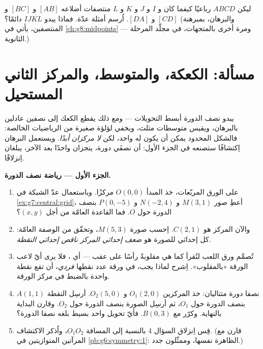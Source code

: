 \begin{exercise}[$\star\star\star$]\label{exo:g7:central:11}
ليكن $ABCD$ رباعيًا كيفما كان و $I$ و $J$ و $K$ و $L$ منتصفات
أضلاعه $[AB]$ و $[BC]$ و $[CD]$ و $[DA]$. اُرسم أمثلة عدّة.
فماذا يبدو $IJKL$ دائمًا؟ (والبرهان، بمبرهنة المنتصفين،
يأتي في \cref{ch:g8:midpoints} --- ومرة أخرى بالمتجهات،
في مجلّد المرحلة الثانوية.)
\end{exercise}

\section{مسألة: الكعكة، والمتوسط، والمركز الثاني
المستحيل}

\begin{problem}
\label{pb:g7:central:1}
يبدو نصف الدورة أبسط التحويلات --- ومع ذلك
يقطع الكعك إلى نصفين عادلين بالبرهان، ويقيس متوسطات
مثلث، ويخفي لؤلؤة صغيرة من الرياضيات الخالصة: فالشكل
المحدود يمكن أن يكون له  واحد، لكن \emph{لا مركزان
أبدًا}. ويستعمل البرهان اِكتشافًا ستصنعه في الجزء الأول: أن
نصفَي دورة، ينجزان واحدًا بعد الآخر، يبلغان اِنزلاقًا.

\medskip
\noindent\textbf{الجزء الأول --- رياضة نصف الدورة.}
\begin{enumerate}
  \item على الورق المربّعات، خذ المبدأ $O(0, 0)$ مركزًا.
        وباستعمال عدّ الشبكة في \cref{ex:g7:central:grid}،
        أعطِ صور $M(3, 1)$ و $N(-2, 4)$ و
        $P(0, -5)$ بنصف الدورة حول $O$. فما
        القاعدة العامّة من أجل $(x, y)$؟
  \item والآن المركز هو $C(2, 1)$. اِحسب صورة
        $M(5, 3)$، وتحقّق من الوصفة العامّة: كل إحداثي
        للصورة هو \emph{ضعف إحداثي المركز ناقص إحداثي
        النقطة}.
  \item تُصمَّم ورق اللعب لتُقرأ كما هي مقلوبةً رأسًا على عقب
        --- أي ، فلا يرى أيّ لاعب الورقة
        «بالمقلوب». اِشرح لماذا يجب، في ورقة عدد نقطها
        \emph{فردي}، أن تقع نقطة واحدة بالضبط في مركز
        الورقة.
  \item نصفا دورة متتاليان: خذ المركزين $O_1(2, 0)$
        و $O_2(5, 0)$. أرسِل النقطة $A(1, 1)$ بنصف
        الدورة حول $O_1$، ثم أرسِل الصورة بنصف
        الدورة حول $O_2$. وقارن البداية بالنهاية. وكرّر
        مع $B(0, 3)$. فأيّ تحويل واحد بسيط بلغه
        نصفا الدورة؟
  \item قِس اِنزلاق السؤال 4 بالنسبة إلى المسافة
        $O_1 O_2$، واُذكر الاكتشاف. (قارن مع
        المرآتين المتوازيتين في \cref{pb:g6:symmetry:1}: الظاهرة نفسها،
        وممثّلون جدد.)
\end{enumerate}


\end{problem}
